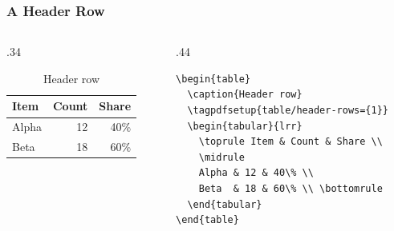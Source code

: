 \documentclass{ltx-talk}
\begin{document}
\begin{frame*}
  \frametitle{A Header Row}
  \begin{columns}
    \begin{column}{.34\textwidth}
      \begin{table}
        \caption{Header row}\label{tab:headerrow}
        \begin{tabular}{lrr}
          \toprule Item & Count & Share \\ \midrule
          Alpha & 12 & 40\% \\
          Beta  & 18 & 60\% \\ \bottomrule
        \end{tabular}
      \end{table}
    \end{column}
    \begin{column}{.44\textwidth}
\small
\begin{verbatim}
\begin{table}
  \caption{Header row}
  \tagpdfsetup{table/header-rows={1}}
  \begin{tabular}{lrr}
    \toprule Item & Count & Share \\
    \midrule
    Alpha & 12 & 40\% \\
    Beta  & 18 & 60\% \\ \bottomrule
  \end{tabular}
\end{table}
\end{verbatim}
    \end{column}
  \end{columns}
\end{frame*}
\end{document}
